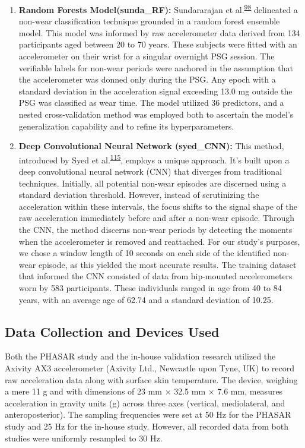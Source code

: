 \documentclass[
  10pt,
]{scrbook}
\begin{document}
\begin{enumerate}
\item
  \textsf{\textbf{Random Forests Model(sunda\_RF):}} Sundararajan et
  al.\textsuperscript{\protect\hyperlink{ref-sundararajan_sleep_2021}{98}}
  delineated a non-wear classification technique grounded in a random
  forest ensemble model. This model was informed by raw accelerometer
  data derived from 134 participants aged between 20 to 70 years. These
  subjects were fitted with an accelerometer on their wrist for a
  singular overnight PSG session. The verifiable labels for non-wear
  periods were anchored in the assumption that the accelerometer was
  donned only during the PSG. Any epoch with a standard deviation in the
  acceleration signal exceeding 13.0 mg outside the PSG was classified
  as wear time. The model utilized 36 predictors, and a nested
  cross-validation method was employed both to ascertain the model's
  generalization capability and to refine its hyperparameters.
\item
  \textsf{\textbf{Deep Convolutional Neural Network (syed\_CNN):}} This
  method, introduced by Syed et
  al.\textsuperscript{\protect\hyperlink{ref-syed_novel_2021}{115}},
  employs a unique approach. It's built upon a deep convolutional neural
  network (CNN) that diverges from traditional techniques. Initially,
  all potential non-wear episodes are discerned using a standard
  deviation threshold. However, instead of scrutinizing the acceleration
  within these intervals, the focus shifts to the signal shape of the
  raw acceleration immediately before and after a non-wear episode.
  Through the CNN, the method discerns non-wear periods by detecting the
  moments when the accelerometer is removed and reattached. For our
  study's purposes, we chose a window length of 10 seconds on each side
  of the identified non-wear episode, as this yielded the most accurate
  results. The training dataset that informed the CNN consisted of data
  from hip-mounted accelerometers worn by 583 participants. These
  individuals ranged in age from 40 to 84 years, with an average age of
  62.74 and a standard deviation of 10.25.
\end{enumerate}

\hypertarget{data-collection-and-devices-used}{%
\subsection{Data Collection and Devices
Used}\label{data-collection-and-devices-used}}

Both the PHASAR study and the in-house validation research utilized the
Axivity AX3 accelerometer (Axivity Ltd., Newcastle upon Tyne, UK) to
record raw acceleration data along with surface skin temperature. The
device, weighing a mere 11 g and with dimensions of 23 mm × 32.5 mm ×
7.6 mm, measures acceleration in gravity units (g) across three axes
(vertical, mediolateral, and anteroposterior). The sampling frequencies
were set at 50 Hz for the PHASAR study and 25 Hz for the in-house study.
However, all recorded data from both studies were uniformly resampled to
30 Hz.
\end{document}
